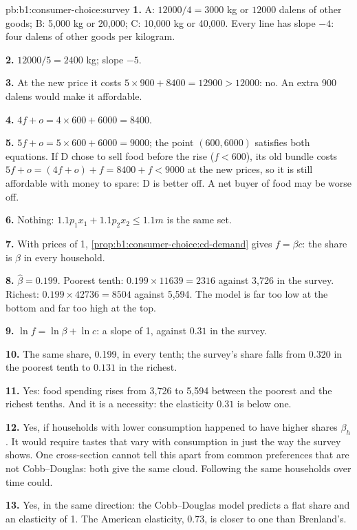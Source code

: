 \begin{solution}{pb:b1:consumer-choice:survey}
\textbf{1.} A: $12000/4 = 3000$ kg or $12000$ dalens of other goods; B: 5,000 kg
or 20,000; C: 10,000 kg or 40,000. Every line has slope $-4$: four dalens
of other goods per kilogram.

\textbf{2.} $12000/5 = 2400$ kg; slope $-5$.

\textbf{3.} At the new price it costs $5 \times 900 + 8400 = 12900 > 12000$: no.
An extra 900 dalens would make it affordable.

\textbf{4.} $4f + o = 4 \times 600 + 6000 = 8400$.

\textbf{5.} $5f + o = 5 \times 600 + 6000 = 9000$; the point $(600, 6000)$ satisfies
both equations. If D chose to sell food before the rise ($f < 600$), its old
bundle costs $5f + o = (4f + o) + f = 8400 + f < 9000$ at the new prices, so
it is still affordable with money to spare: D is better off. A net buyer of
food may be worse off.

\textbf{6.} Nothing: $1.1p_1x_1 + 1.1p_2x_2 \le 1.1m$ is the same set.

\textbf{7.} With prices of 1, \cref{prop:b1:consumer-choice:cd-demand} gives
$f = \beta c$: the share is $\beta$ in every household.

\textbf{8.} $\hat\beta = 0.199$. Poorest tenth: $0.199 \times 11639 = 2316$
against 3,726 in the survey. Richest: $0.199 \times 42736 = 8504$ against
5,594. The model is far too low at the bottom and far too high at the top.

\textbf{9.} $\ln f = \ln\beta + \ln c$: a slope of 1, against $0.31$ in the survey.

\textbf{10.} The same share, 0.199, in every tenth; the survey's share falls
from $0.320$ in the poorest tenth to $0.131$ in the richest.

\textbf{11.} Yes: food spending rises from 3,726 to 5,594 between the poorest
and the richest tenths. And it is a necessity: the elasticity $0.31$ is
below one.

\textbf{12.} Yes, if households with lower consumption happened to have
higher shares $\beta_h$. It would require tastes that vary with consumption
in just the way the survey shows. One cross-section cannot tell this apart
from common preferences that are not Cobb--Douglas: both give the same
cloud. Following the same households over time could.

\textbf{13.} Yes, in the same direction: the Cobb--Douglas model predicts a
flat share and an elasticity of 1. The American elasticity, $0.73$, is
closer to one than Brenland's.


\end{solution}
